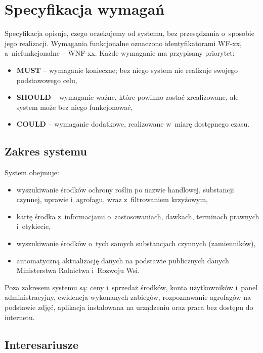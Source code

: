\newpage
\section{Specyfikacja wymagań}
\label{sec:specyfikacja}

Specyfikacja opisuje, czego oczekujemy od systemu, bez przesądzania o~sposobie
jego realizacji. Wymagania funkcjonalne oznaczono identyfikatorami WF-xx,
a~niefunkcjonalne -- WNF-xx. Każde wymaganie ma przypisany priorytet:

\begin{itemize}
    \item \textbf{MUST} -- wymaganie konieczne; bez niego system nie realizuje
    swojego podstawowego celu,
    \item \textbf{SHOULD} -- wymaganie ważne, które powinno zostać zrealizowane,
    ale system może bez niego funkcjonować,
    \item \textbf{COULD} -- wymaganie dodatkowe, realizowane w~miarę dostępnego
    czasu.
\end{itemize}

\subsection{Zakres systemu}

System obejmuje:

\begin{itemize}
    \item wyszukiwanie środków ochrony roślin po nazwie handlowej, substancji
    czynnej, uprawie i~agrofagu, wraz z~filtrowaniem krzyżowym,
    \item kartę środka z~informacjami o~zastosowaniach, dawkach, terminach
    prawnych i~etykiecie,
    \item wyszukiwanie środków o~tych samych substancjach czynnych
    (zamienników),
    \item automatyczną aktualizację danych na podstawie publicznych danych
    Ministerstwa Rolnictwa i~Rozwoju Wsi.
\end{itemize}

Poza zakresem systemu są: ceny i~sprzedaż środków, konta użytkowników i~panel
administracyjny, ewidencja wykonanych zabiegów, rozpoznawanie agrofagów na
podstawie zdjęć, aplikacja instalowana na urządzeniu oraz praca bez dostępu do
internetu.

\subsection{Interesariusze}

